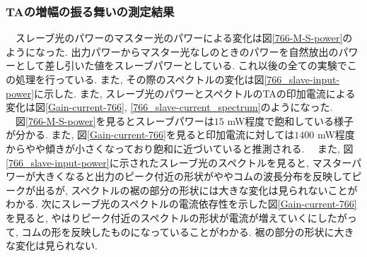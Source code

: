 \documentclass[uplatex, dvipdfmx, a4paper, report, papersize, 11pt]{jsbook}
\begin{document}
\subsubsection{TAの増幅の振る舞いの測定結果}
　スレーブ光のパワーのマスター光のパワーによる変化は図\ref{766-M-S-power}のようになった. 出力パワーからマスター光なしのときのパワーを自然放出のパワーとして差し引いた値をスレーブパワーとしている. これ以後の全ての実験でこの処理を行っている. また, その際のスペクトルの変化は図\ref{766_slave-input-power}に示した. また, スレーブ光のパワーとスペクトルのTAの印加電流による変化は図\ref{Gain-current-766}, \ref{766_slave-current_spectrum}のようになった. \\
　図\ref{766-M-S-power}を見るとスレーブパワーは$15$ mW程度で飽和している様子が分かる. また, 図\ref{Gain-current-766}を見ると印加電流に対しては$1400$ mW程度からやや傾きが小さくなっており飽和に近づいていると推測される.
　また, 図\ref{766_slave-input-power}に示されたスレーブ光のスペクトルを見ると, マスターパワーが大きくなると出力のピーク付近の形状がややコムの波長分布を反映してピークが出るが, スペクトルの裾の部分の形状には大きな変化は見られないことがわかる. 次にスレーブ光のスペクトルの電流依存性を示した図\ref{Gain-current-766}を見ると, やはりピーク付近のスペクトルの形状が電流が増えていくにしたがって, コムの形を反映したものになっていることがわかる. 裾の部分の形状に大きな変化は見られない.
\newpage
\end{document}
